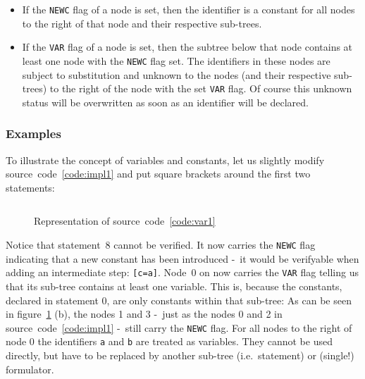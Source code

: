 \documentclass[british]{article}
\newenvironment{code}{\captionsetup{type=listing}}{}
\newcommand\prv{bc}
\newcommand\m[1]{\texttt{#1}}
\begin{document}
\textcolor{dartmouthgreen}{\begin{itemize}
	\item 
		If the \texttt{NEWC} flag of a node is set, then the identifier is a
		constant for all nodes to the right of that node and their respective
		sub-trees.
	\item
		If the \texttt{VAR} flag of a node is set, then the subtree below that
		node contains at least one node with the \texttt{NEWC} flag set. The
		identifiers in these nodes are subject to substitution and unknown to
		the nodes (and their respective sub-trees) to the right of the node with
		the set \texttt{VAR} flag. Of course this unknown status will be
		overwritten as soon as an identifier will be declared.
\end{itemize}}

\pagebreak{}

\subsubsection{Examples}
To illustrate the concept of variables and constants, let us slightly modify
source~code~\ref{code:impl1} and put square brackets around the first two
statements:

\begin{code}
\label{code:var1}
\inputminted[linenos]{\prv}{examples/var1.prove}
\end{code}

\begin{figure}[!h]
\caption{Representation of source~code~\ref{code:var1}}\label{fig:var1}
\centering
{}
\end{figure}

Notice that statement~8 cannot be verified. It now carries the \texttt{NEWC}
flag indicating that a new constant has been introduced -\ it would be
verifyable when adding an intermediate step: \m{[c=a]}. Node~0 on now carries
the \texttt{VAR} flag telling us that its sub-tree contains at least one
variable.  This is, because the constants, declared in statement 0, are only
constants within that sub-tree: As can be seen in figure~\ref{fig:var1} (b), the
nodes 1 and 3 -\ just as the nodes 0 and 2 in source~code~\ref{code:impl1} -\
still carry the \texttt{NEWC} flag.  For all nodes to the right of node 0 the
identifiers \m{a} and \m{b} are treated as variables. They cannot be used
directly, but have to be replaced by another sub-tree (i.e.\ statement) or
(single!) formulator.
\end{document}
